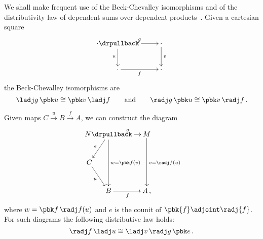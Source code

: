 \begin{para}\label{para:BC-distr}
  We shall make frequent use of the Beck-Chevalley isomorphisms and
  of the distributivity law of dependent sums over dependent
  products~\cite{MoerdijkI:weltc}.  Given a cartesian square
  \[
  \xymatrix {
  \cdot \drpullback \ar[r]^g \ar[d]_u & \cdot \ar[d]^v \\
  \cdot \ar[r]_f & \cdot
  }
  \]
  the Beck-Chevalley isomorphisms are
  \[
    \ladj g \, \pbk u \iso \pbk v \, \ladj f \qquad \text{and} \qquad
    \radj g \, \pbk u \iso \pbk v \, \radj f \,.
    \]

  Given maps $C \stackrel u \longrightarrow B \stackrel f \longrightarrow A$,
  we can construct the diagram
  \begin{equation}\label{distr-diag}
  \xymatrixrowsep{40pt}
  \xymatrixcolsep{27pt}
  \vcenter{\hbox{
  \xymatrix @!=0pt {
  &N \drpullback \ar[rr]^g \ar[ld]_e \ar[dd]^{w=\pbk f(v)}&& M \ar[dd]^{v=\radj f (u)} \\
  C \ar[rd]_u && & \\
  &B \ar[rr]_f && A\,,
  }}}
  \end{equation}
  where $w = \pbk f\, \radj f(u)$ and $e$ is the counit
  of $\pbk{f} \adjoint \radj{f}$.
  For such diagrams the following
  distributive law holds:
  \begin{equation}\label{distr-law}
  \radj f \, \ladj u \iso \ladj v \, \radj g \, \pbk e \,.
  \end{equation}



\end{para}
